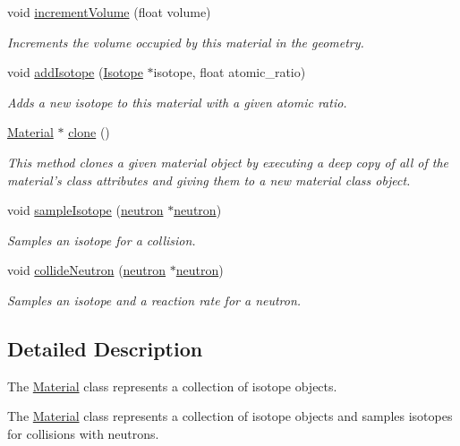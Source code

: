 \begin{DoxyCompactItemize}
void \hyperlink{classMaterial_affdd4a5887ae6cfb3772c7ebe6181a57}{increment\-Volume} (float volume)
\begin{DoxyCompactList}\small\item\em Increments the volume occupied by this material in the geometry. \end{DoxyCompactList}\item 
void \hyperlink{classMaterial_a397c579dfabdd309348de2b5875f74f9}{add\-Isotope} (\hyperlink{classIsotope}{Isotope} $\ast$isotope, float atomic\-\_\-ratio)
\begin{DoxyCompactList}\small\item\em Adds a new isotope to this material with a given atomic ratio. \end{DoxyCompactList}\item 
\hyperlink{classMaterial}{Material} $\ast$ \hyperlink{classMaterial_a417cf6f7c2cc82c04599e5a29b620a64}{clone} ()
\begin{DoxyCompactList}\small\item\em This method clones a given material object by executing a deep copy of all of the material's class attributes and giving them to a new material class object. \end{DoxyCompactList}\item 
void \hyperlink{classMaterial_a45bc347522e5f10ffdf05e0c6a68001f}{sample\-Isotope} (\hyperlink{structneutron}{neutron} $\ast$\hyperlink{structneutron}{neutron})
\begin{DoxyCompactList}\small\item\em Samples an isotope for a collision. \end{DoxyCompactList}\item 
void \hyperlink{classMaterial_a3edcd9cac4f7e663499c4f6645aefa8c}{collide\-Neutron} (\hyperlink{structneutron}{neutron} $\ast$\hyperlink{structneutron}{neutron})
\begin{DoxyCompactList}\small\item\em Samples an isotope and a reaction rate for a neutron. \end{DoxyCompactList}\end{DoxyCompactItemize}


\subsection{Detailed Description}
The \hyperlink{classMaterial}{Material} class represents a collection of isotope objects. 

The \hyperlink{classMaterial}{Material} class represents a collection of isotope objects and samples isotopes for collisions with neutrons. 

